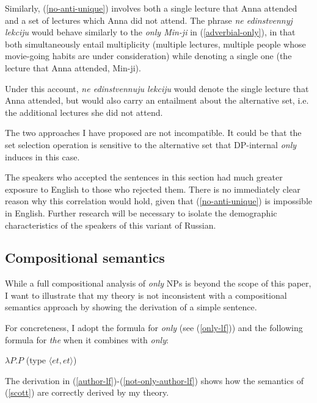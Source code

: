 Similarly, (\ref{no-anti-unique}) involves both a single lecture that Anna attended and a set of lectures which Anna did not attend. The phrase \textit{ne edinstvennyj lekciju} would behave similarly to the \textit{only Min-ji} in (\ref{adverbial-only}), in that both simultaneously entail multiplicity (multiple lectures, multiple people whose movie-going habits are under consideration) while denoting a single one (the lecture that Anna attended, Min-ji).

Under this account, \textit{ne edinstvennuju lekciju} would denote the single lecture that Anna attended, but would also carry an entailment about the alternative set, i.e. the additional lectures she did not attend.

The two approaches I have proposed are not incompatible. It could be that the set selection operation is sensitive to the alternative set that DP-internal \textit{only} induces in this case.

The speakers who accepted the sentences in this section had much greater exposure to English to those who rejected them. There is no immediately clear reason why this correlation would hold, given that (\ref{no-anti-unique}) is impossible in English. Further research will be necessary to isolate the demographic characteristics of the speakers of this variant of Russian.

\subsection{Compositional semantics}
While a full compositional analysis of \textit{only} NPs is beyond the scope of this paper, I want to illustrate that my theory is not inconsistent with a compositional semantics approach by showing the derivation of a simple sentence.

For concreteness, I adopt the  formula for \textit{only} (see (\ref{only-lf})) and the following formula for \textit{the} when it combines with \textit{only}:

\begin{exe}
	\ex $\lambda P . P$ (type $\langle et, et \rangle$)
\end{exe}

The derivation in (\ref{author-lf})-(\ref{not-only-author-lf}) shows how the semantics of (\ref{scott}) are correctly derived by my theory.

